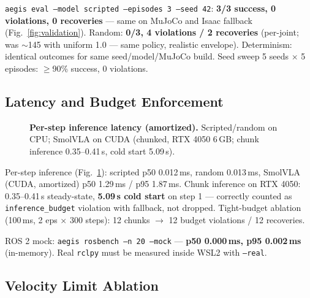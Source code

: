 \documentclass[11pt,a4paper,twocolumn]{article}
\begin{document}
\texttt{aegis eval --model scripted --episodes 3 --seed 42}: \textbf{3/3 success, 0 violations, 0 recoveries} --- same on MuJoCo and Isaac fallback (Fig.~\ref{fig:validation}). Random: \textbf{0/3, 4 violations / 2 recoveries} (per-joint; was $\sim$145 with uniform 1.0 --- same policy, realistic envelope). Determinism: identical outcomes for same seed/model/MuJoCo build. Seed sweep 5 seeds $\times$ 5 episodes: $\geq$90\% success, 0 violations.

\subsection{Latency and Budget Enforcement}

\begin{figure}[htbp]
\centering
{}
\caption{\textbf{Per-step inference latency (amortized).} Scripted/random on CPU; SmolVLA on CUDA (chunked, RTX 4050 6\,GB; chunk inference 0.35--0.41\,s, cold start 5.09\,s).}
\label{fig:latency}
\end{figure}

Per-step inference (Fig.~\ref{fig:latency}): scripted p50 0.012\,ms, random 0.013\,ms, SmolVLA (CUDA, amortized) p50 1.29\,ms / p95 1.87\,ms. Chunk inference on RTX 4050: 0.35--0.41\,s steady-state, \textbf{5.09\,s cold start} on step 1 --- correctly counted as \texttt{inference\_budget} violation with fallback, not dropped. Tight-budget ablation (100\,ms, 2 eps $\times$ 300 steps): 12 chunks $\rightarrow$ 12 budget violations / 12 recoveries.

ROS 2 mock: \texttt{aegis rosbench --n 20 --mock} --- \textbf{p50 0.000\,ms, p95 0.002\,ms} (in-memory). Real \texttt{rclpy} must be measured inside WSL2 with \texttt{--real}.

\subsection{Velocity Limit Ablation}
\end{document}

